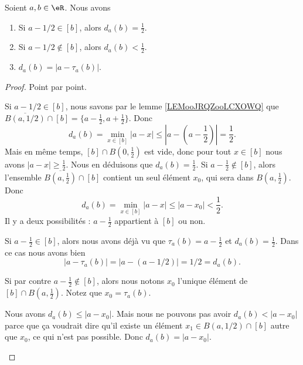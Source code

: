\begin{lemma}	\label{LEMooRMLSooNOKXkQ}
	Soient \( a,b\in \eR\). Nous avons
	\begin{enumerate}
		\item		\label{ITEMooHRISooLsqKqd}
		      Si \( a-1/2\in[b]\), alors \( d_a(b)=\frac{ 1 }{2}\).
		\item	\label{ITEMooXMNYooKQYaee}
		      Si \( a-1/2\not\in[b]\), alors \( d_a(b)<\frac{ 1 }{2}\).
		\item	\label{ITEMooMUCXooBWrRMz}
		      \( d_a(b)=| a-\tau_a(b) |\).
	\end{enumerate}
\end{lemma}

\begin{proof}
	Point par point.
	\begin{subproof}
		Si \( a-1/2\in[b]\), nous savons par le lemme \ref{LEMooJRQZooLCXOWQ} que \( \overline{B(a,1/2)}\cap [b]=\{ a-\frac{ 1 }{2},a+\frac{ 1 }{2} \}\). Donc
		\begin{equation}
			d_a(b)=\min_{x\in [b]}| a-x |\leq | a-(a-\frac{1  }{2}) |=\frac{ 1 }{2}.
		\end{equation}
		Mais en même temps, \( [b]\cap B(0,\frac{ 1 }{2})\) est vide, donc pour tout \( x\in [b]\) nous avons \( | a-x |\geq \frac{ 1 }{2}\). Nous en déduisons que \( d_a(b)=\frac{ 1 }{2}\).
		Si \( a-\frac{ 1 }{2}\not\in[b]\), alors l'ensemble \( \overline{B(a,\frac{ 1 }{2})}\cap [b]\) contient un seul élément \( x_0\), qui sera dans \( B(a,\frac{ 1 }{2})\). Donc
		\begin{equation}
			d_a(b)=\min_{x\in[b]}| a-x |\leq | a-x_0 |<\frac{ 1 }{2}.
		\end{equation}
		Il y a deux possibilités : \( a-\frac{ 1 }{2}\) appartient à \( [b]\) ou non.

		Si \( a-\frac{ 1 }{2}\in[b]\), alors nous avons déjà vu que \( \tau_a(b)=a-\frac{ 1 }{2}\) et \( d_a(b)=\frac{ 1 }{2}\). Dans ce cas nous avons bien
		\begin{equation}
			| a-\tau_a(b) |=| a-(a-1/2) |=1/2=d_a(b).
		\end{equation}

		Si par contre \( a-\frac{ 1 }{2}\not\in[b]\), alors nous notons \( x_0\) l'unique élément de \( [b]\cap B(a,\frac{ 1 }{2})\). Notez que \( x_0=\tau_a(b)\).

		Nous avons \( d_a(b)\leq | a-x_0 |\). Mais nous ne pouvons pas avoir \( d_a(b)<| a-x_0 |\) parce que ça voudrait dire qu'il existe un élément \( x_1\in B(a,1/2)\cap [b]\) autre que \( x_0\), ce qui n'est pas possible. Donc \( d_a(b)=| a-x_0 |\).
	\end{subproof}
\end{proof}

